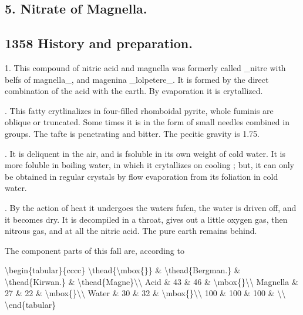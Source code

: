 \subsection*{5. Nitrate of Magnella.}
\subsection*{1358
History and preparation.}
1. This compound of nitric acid and magnella was formerly called \_nitre with belfs of magnella\_, and magenina \_lolpetere\_. It is formed by the direct combination of the acid with the earth. By evaporation it is crytallized.\par{}. This fatty crytlinalizes in four-filled rhomboidal pyrite, whole fuminis are oblique or truncated. Some times it is in the form of small needles combined in groups. The tafte is penetrating and bitter. The pecitic gravity is 1.75.\par{}. It is deliquent in the air, and is fsoluble in its own weight of cold water. It is more foluble in boiling water, in which it crytallizes on cooling ; but, it can only be obtained in regular crystals by flow evaporation from its foliation in cold water.\par{}. By the action of heat it undergoes the waters fufen, the water is driven off, and it becomes dry. It is decompiled in a throat, gives out a little oxygen gas, then nitrous gas, and at all the nitric acid. The pure earth remains behind.\par\medskip
The component parts of this fall are, according to\par\medskip
\textbackslash{}begin\{tabular\}\{cccc\}
\textbackslash{}thead\{\textbackslash{}mbox\{\}\} \& \textbackslash{}thead\{Bergman.\} \& \textbackslash{}thead\{Kirwan.\} \& \textbackslash{}thead\{Magne\}\textbackslash{}\textbackslash{}
Acid \& 43 \& 46 \& \textbackslash{}mbox\{\}\textbackslash{}\textbackslash{}
Magnella \& 27 \& 22 \& \textbackslash{}mbox\{\}\textbackslash{}\textbackslash{}
Water \& 30 \& 32 \& \textbackslash{}mbox\{\}\textbackslash{}\textbackslash{}
100 \& 100 \& 100 \& \textbackslash{}\textbackslash{}
\textbackslash{}end\{tabular\}\par\medskip
